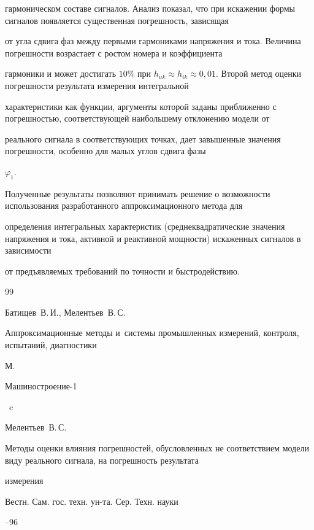 гармоническом составе сигналов. Анализ показал, что при искажении формы сигналов появляется существенная погрешность, зависящая

от угла сдвига фаз между первыми гармониками напряжения и тока. Величина погрешности возрастает с ростом номера и коэффициента

гармоники и может достигать $10\%$ при $h_{uk}\approx h_{ik}\approx 0{,}01$. Второй метод оценки погрешности результата измерения интегральной

характеристики как функции, аргументы которой заданы приближенно с погрешностью, соответствующей наибольшему отклонению модели от

реального сигнала в соответствующих точках, дает завышенные значения погрешности, особенно для малых углов сдвига фазы

$\varphi_{1}$.



Полученные результаты позволяют принимать решение о возможности использования разработанного аппроксимационного метода для

определения интегральных характеристик (среднеквадратические значения напряжения и тока, активной и реактивной мощности) искаженных сигналов в зависимости

от предъявляемых требований по точности и быстродействию.





\begin{thebibliography}{99}




\by Батищев~В.\,И., Мелентьев~В.\,С.

\book Аппроксимационные методы и~системы промышленных измерений, контроля, испытаний, диагностики


\publaddr М.

\publ Машиностроение-1

~c




\by Мелентьев~В.\,С.

\paper Методы оценки влияния погрешностей, обусловленных не соответствием модели виду реального сигнала, на погрешность результата

измерения

\jour Вестн. Сам. гос. техн. ун-та. Сер. Техн. науки



--96



\end{thebibliography}



\makeengtitle





%

